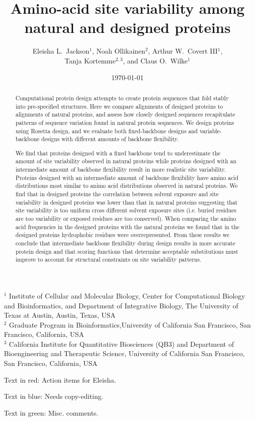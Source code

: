 \documentclass[12pt]{article}
\title{Amino-acid site variability among natural and designed proteins}
\author{Eleisha L.\ Jackson$^1$, Noah Ollikainen$^2$, Arthur W.\ Covert III$^1$,\\ Tanja Kortemme$^{2,3}$, and Claus O.\ Wilke$^1$}
\begin{document}
\date{\today}
\maketitle

\noindent
$^1$ Institute of Cellular and Molecular Biology, Center for Computational Biology and Bioinformatics, and Department of Integrative Biology, The University of Texas at Austin, Austin, Texas, USA\\
$^2$ Graduate Program in Bioinformatics,University of California San Francisco, San Francisco, California, USA\\
$^3$ California Institute for Quantitative Biosciences (QB3) and Department of Bioengineering and Therapeutic Science, University of California San Francisco, San Francisco, California, USA

\bigskip

\noindent
{\color{red}Text in red: Action items for Eleisha.}

\noindent
{\color{blue}Text in blue: Needs copy-editing.}

\noindent
{\color{green}Text in green: Misc. comments.}

\begin{abstract}
Computational protein design attempts to create protein sequences that fold stably into pre-specified structures. Here we compare alignments of designed proteins to alignments of natural proteins, and assess how closely designed sequences recapitulate patterns of sequence variation found in natural protein sequences. We design proteins using Rosetta design, and we evaluate both fixed-backbone designs and variable-backbone designs with different amounts of backbone flexibility.

We find that proteins designed with a fixed backbone tend to underestimate the amount of site variability observed in natural proteins while proteins designed with an intermediate amount of backbone flexibility result in more realistic site variability. Proteins designed with an intermediate amount of backbone flexibility have amino acid distributions most similar to animo acid distributions observed in natural proteins. 
We find that in designed proteins the correlation between solvent exposure and site variability in designed proteins was lower than that in natural proteins suggesting that site variability is too uniform cross different solvent exposure sites (i.e. buried residues are too variability or exposed residues are too conserved). When comparing the amino acid frequencies in the designed proteins with the natural proteins we found that in the designed proteins hydrophobic residues were overrepresented. From these results we conclude that intermediate backbone flexibility during design results in more accurate protein design and that scoring functions that determine acceptable substitutions must improve to account for structural constraints on site variability patterns.
\end{abstract}
\end{document}
